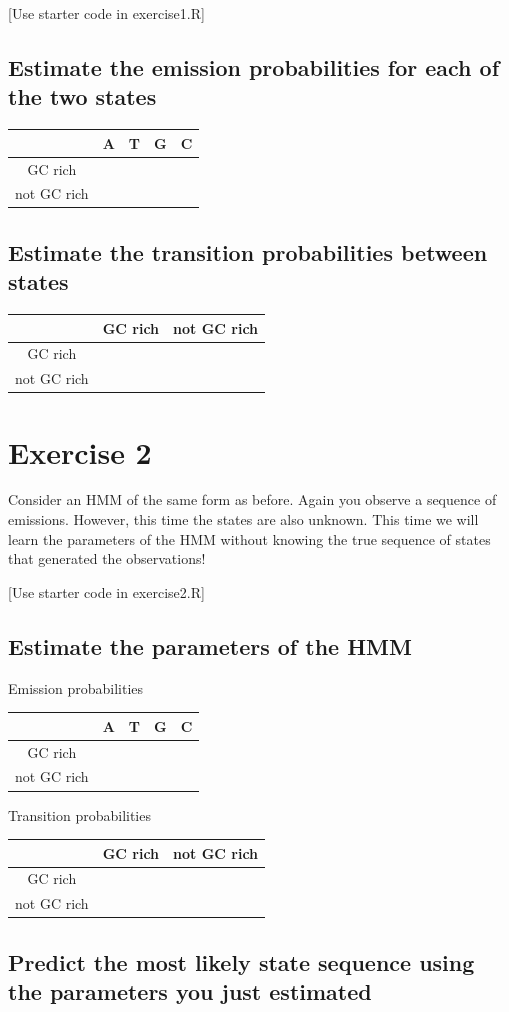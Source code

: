 \documentclass[11pt, oneside]{article}
\begin{document}
[Use starter code in exercise1.R]

\subsection{Estimate the emission probabilities for each of the two states}
\begin{table}[H]
\centering
\begin{tabular}{|c|c|c|c|c|}
\hline
& A & T & G & C \\\hline
GC rich & & & &  \\\hline
not GC rich & & & & \\\hline
\end{tabular}
\end{table}

\subsection{Estimate the transition probabilities between states}
\begin{table}[H]
\centering
\begin{tabular}{|c|c|c|}
\hline
& GC rich & not GC rich \\\hline
GC rich & &  \\\hline
not GC rich & &  \\\hline
\end{tabular}
\end{table}

\section{Exercise 2}
Consider an HMM of the same form as before. 
Again you observe a sequence of emissions. 
However, this time the states are also unknown. 
This time we will learn the parameters of the HMM without knowing the true sequence of states that generated the observations! 

[Use starter code in exercise2.R]

\subsection{Estimate the parameters of the HMM}
Emission probabilities
\begin{table}[H]
\centering
\begin{tabular}{|c|c|c|c|c|}
\hline
& A & T & G & C \\\hline
GC rich & & & &  \\\hline
not GC rich & & & & \\\hline
\end{tabular}
\end{table}

Transition probabilities
\begin{table}[H]
\centering
\begin{tabular}{|c|c|c|}
\hline
& GC rich & not GC rich \\\hline
GC rich & &  \\\hline
not GC rich & &  \\\hline
\end{tabular}
\end{table}

\subsection{Predict the most likely state sequence using the parameters you just estimated}
\end{document}
